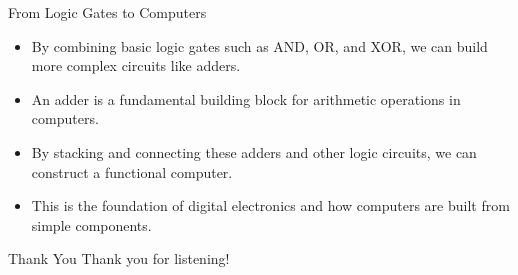 \documentclass{beamer}
\begin{document}
\begin{frame}{From Logic Gates to Computers}
    \begin{itemize}
        \item By combining basic logic gates such as AND, OR, and XOR, we can build more complex circuits like adders.
        \item An adder is a fundamental building block for arithmetic operations in computers.
        \item By stacking and connecting these adders and other logic circuits, we can construct a functional computer.
        \item This is the foundation of digital electronics and how computers are built from simple components.
    \end{itemize}
\end{frame}

\begin{frame}{Thank You}
    \centering
    Thank you for listening!
\end{frame}
\end{document}
